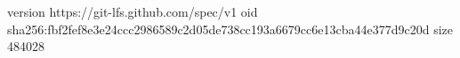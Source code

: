 version https://git-lfs.github.com/spec/v1
oid sha256:fbf2fef8e3e24ccc2986589c2d05de738cc193a6679cc6e13cba44e377d9c20d
size 484028
